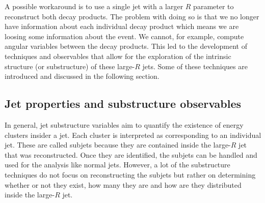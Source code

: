 
A possible workaround is to use a single jet with a larger $R$ parameter to reconstruct both decay products. The problem with doing so is that we no longer have information about each individual decay product which means we are loosing some information about the event. We cannot, for example, compute angular variables between the decay products. This led to the development of techniques and observables that allow for the exploration of the intrinsic structure (or substructure) of these large-$R$ jets. Some of these techniques are introduced and discussed in the following section.  

\subsection{Jet properties and substructure observables}
\label{section_jet_sub}



In general, jet substructure variables aim to quantify the existence of energy clusters  insider a jet. Each cluster is interpreted as corresponding to an individual jet. These are called subjets because they are contained inside the large-$R$ jet that was reconstructed. Once they are identified, the subjets can be handled and used for the analysis like normal jets. However, a lot of the substructure techniques do not focus on reconstructing the subjets but rather on determining whether or not they exist, how many they are and how are they distributed inside the large-$R$ jet. 

